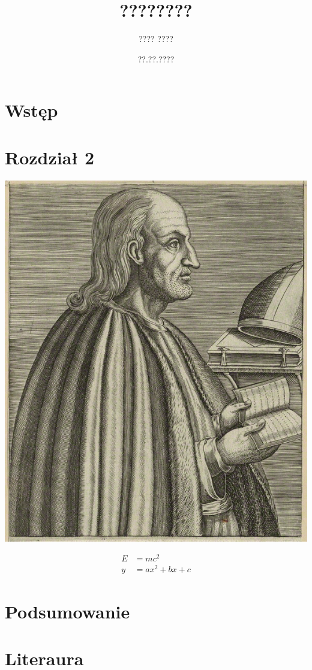 \documentclass{eiti-raport}
\begin{document}
\author{???? ????}
\date{??.??.????}
\subject{???? ?????}
\title{????????}

\maketitle


\begin{multicols}{2}

\section{Wstęp} \label{sec:intro}
\lipsum[1-2]

\section{Rozdział 2} \label{sec:2}
\lipsum[3]
\begin{center}
	\label{fig:anzelm}
	\includegraphics[width=0.5\linewidth]{img/anzelm.PNG}
\end{center}
\lipsum[4]
\begin{align*}
E & = m c^2 \\ 
y & = a x^2 + bx + c
\end{align*}
\lipsum[5]

\section{Podsumowanie} \label{sec:summary}
\lipsum[6]

\section*{Literaura}


\end{multicols}
\end{document}
